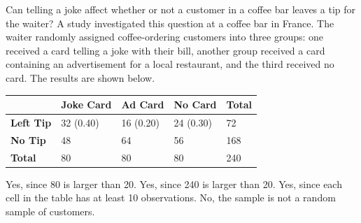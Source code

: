 \documentclass{article}
\begin{document}
\begin{mcquestions}
		
		\question Can telling a joke affect whether or not a customer in a coffee bar leaves a tip for the waiter? A study investigated this question at a coffee bar in France. The waiter randomly assigned coffee-ordering customers into three groups: one received a card telling a joke with their bill, another group received a card containing an advertisement for a local restaurant, and the third received no card. The results are shown below.
		\begin{center}
			\begin{tabular}{| l | l | l | l | l |}
				\hline
				& \textbf{Joke Card} & \textbf{Ad Card} & \textbf{No Card} & \textbf{Total} \\
				\hline
				\textbf{Left Tip} & 32 (0.40) & 16 (0.20) & 24 (0.30) & 72 \\
				\hline
				\textbf{No Tip} & 48 & 64 & 56 & 168 \\
				\hline
				\textbf{Total} & 80 & 80 & 80 & 240 \\
				\hline
			\end{tabular}
		\end{center}
		\begin{mcanswerslist}
			\answer Yes, since 80 is larger than 20.
			\answer Yes, since 240 is larger than 20.
			\answer[correct] Yes, since each cell in the table has at least 10 observations.
			\answer No, the sample is not a random sample of customers.
		\end{mcanswerslist}
		
		
		
	\end{mcquestions}
\end{document}
